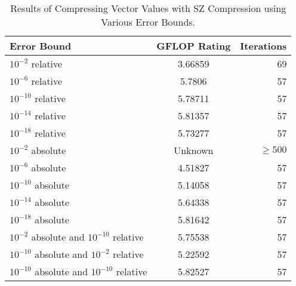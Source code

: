 \begin{table}
	\centering
	\begin{tabular}{l|S|r}
		Error Bound & {GFLOP Rating} & Iterations \\
		\hline
		\(10^{-2}\) relative & 3.66859 & 69 \\
		\(10^{-6}\) relative & 5.7806 & 57 \\
		\(10^{-10}\) relative & 5.78711 & 57 \\
		\(10^{-14}\) relative & 5.81357 & 57 \\
		\(10^{-18}\) relative & 5.73277 & 57 \\
		\(10^{-2}\) absolute & {Unknown} & \(\geq 500\) \\
		\(10^{-6}\) absolute & 4.51827 & 57 \\
		\(10^{-10}\) absolute & 5.14058 & 57\\
		\(10^{-14}\) absolute & 5.64338 & 57 \\
		\(10^{-18}\) absolute & 5.81642 & 57 \\
		\(10^{-2}\) absolute and \(10^{-10}\) relative & 5.75538 & 57 \\
		\(10^{-10}\) absolute and \(10^{-2}\) relative & 5.22592 & 57 \\
		\(10^{-10}\) absolute and \(10^{-10}\) relative & 5.82527 & 57 \\
	\end{tabular}
	\caption{Results of Compressing Vector Values with SZ Compression using Various Error Bounds.}
	\label{tab:results-vec-SZ}
\end{table}